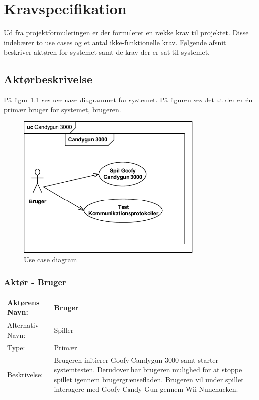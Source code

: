 \chapter{Kravspecifikation}
Ud fra projektformuleringen er der formuleret en række krav til projektet. Disse indebærer to use cases og et antal ikke-funktionelle krav. Følgende afsnit beskriver aktøren for systemet samt de krav der er sat til systemet.

\section{Aktørbeskrivelse}
På figur \ref{fig:useCaseDiagram} ses use case diagrammet for systemet. På figuren ses det at der er én primær bruger for systemet, brugeren. 

\begin{figure}[H]
	\centering
	\includegraphics[width=0.80\textwidth]{Kravsspecifikation/images/usecaseDiagram}
	\caption{Use case diagram}
	\label{fig:useCaseDiagram}
\end{figure}



\subsection{Aktør - Bruger}

\begin{tabularx}{\textwidth}{| p{2cm} | p{9.1cm} |}
	\hline
	Aktørens Navn: & Bruger \\ 
	\hline
	Alternativ Navn: & Spiller \\
	\hline
	Type: & Primær \\
	\hline
	Beskrivelse: & Brugeren initierer Goofy Candygun 3000 samt starter systemtesten. Derudover har brugeren mulighed for at stoppe spillet igennem brugergrænsefladen. Brugeren vil under spillet interagere med Goofy Candy Gun gennem Wii-Nunchucken.
	\\ \hline
\end{tabularx}

